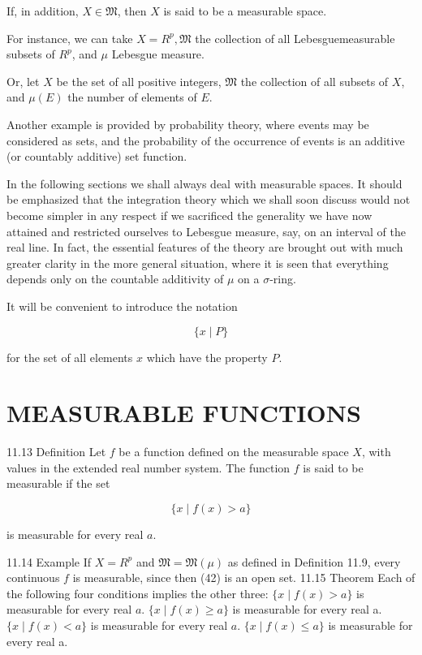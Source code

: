\documentclass[10pt]{article}
\begin{document}
If, in addition, $X \in \mathfrak{M}$, then $X$ is said to be a measurable space.

For instance, we can take $X=R^{p}, \mathfrak{M}$ the collection of all Lebesguemeasurable subsets of $R^{p}$, and $\mu$ Lebesgue measure.

Or, let $X$ be the set of all positive integers, $\mathfrak{M}$ the collection of all subsets of $X$, and $\mu(E)$ the number of elements of $E$.

Another example is provided by probability theory, where events may be considered as sets, and the probability of the occurrence of events is an additive (or countably additive) set function.

In the following sections we shall always deal with measurable spaces. It should be emphasized that the integration theory which we shall soon discuss would not become simpler in any respect if we sacrificed the generality we have now attained and restricted ourselves to Lebesgue measure, say, on an interval of the real line. In fact, the essential features of the theory are brought out with much greater clarity in the more general situation, where it is seen that everything depends only on the countable additivity of $\mu$ on a $\sigma$-ring.

It will be convenient to introduce the notation

$$
\{x \mid P\}
$$

for the set of all elements $x$ which have the property $P$.

\section{MEASURABLE FUNCTIONS}
11.13 Definition Let $f$ be a function defined on the measurable space $X$, with values in the extended real number system. The function $f$ is said to be measurable if the set

$$
\{x \mid f(x)>a\}
$$

is measurable for every real $a$.

11.14 Example If $X=R^{p}$ and $\mathfrak{M}=\mathfrak{M}(\mu)$ as defined in Definition 11.9, every continuous $f$ is measurable, since then (42) is an open set. 11.15 Theorem Each of the following four conditions implies the other three: $\{x \mid f(x)>a\}$ is measurable for every real $a$. $\{x \mid f(x) \geq a\}$ is measurable for every real a. $\{x \mid f(x)<a\}$ is measurable for every real $a$. $\{x \mid f(x) \leq a\}$ is measurable for every real a.
\end{document}
